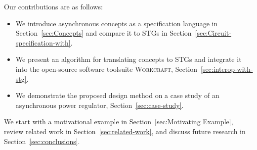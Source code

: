 \documentclass[british, journal]{IEEEtran}
\newcommand{\noun}[1]{\textsc{#1}}
\begin{document}
Our contributions are as follows:
\begin{itemize}
  \item We introduce asynchronous concepts as a specification
  language in Section~\ref{sec:Concepts} and compare it to STGs in
  Section~\ref{sec:Circuit-specification-with}.
  \item We present an algorithm for translating concepts to STGs
  and integrate it into the open-source software toolsuite \noun{Workcraft},
  Section~\ref{sec:interop-with-stg}.
  \item We demonstrate the proposed design method on a case study of an
  asynchronous power regulator, Section~\ref{sec:case-study}.
\end{itemize}

\noindent
We start with a motivational example in Section~\ref{sec:Motivating Example}, review related work
in Section~\ref{sec:related-work}, and discuss future research in Section~\ref{sec:conclusions}.




\end{document}
